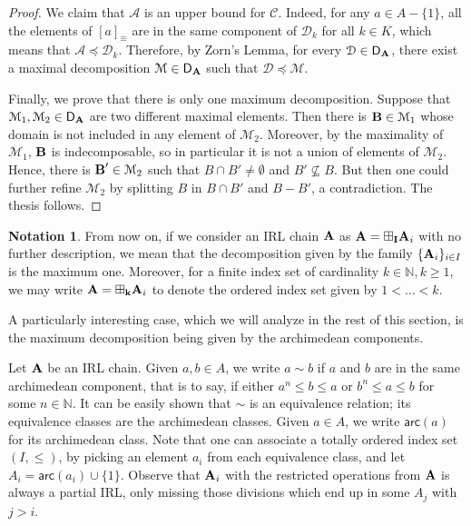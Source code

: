 \documentclass{amsart}
\theoremstyle{definition}
\newtheorem{notation}{Notation}
\numberwithin{equation}{section}
\newcommand{\alg}[1]{{\textbf{\upshape #1}}}  %
\newcommand{\vv}[1]{\mathsf {#1}}
\newcommand{\cc}[1]{\mathcal{#1}}
\newcommand{\arc}[1]{{\vv{arc}}(#1)}
\begin{document}
\begin{proof}
We claim that $\cc A$ is an upper bound for $\mathscr{C}$. Indeed, for any $a \in A-\{1\}$, all the elements of $[a]_\equiv$ are in the same component of $\cc D_k$ for all $k \in K$, which means that $\cc A \preceq \cc D_k$.
Therefore, by Zorn's Lemma, for every $\cc D \in \vv{D}_{\alg A}$, there exist a maximal decomposition $\cc M \in \vv{D}_{\alg A}$ such that $\cc D \preceq \cc M$. 

Finally, we prove that there is only one maximum decomposition.
Suppose that $\cc M_1, \cc M_2 \in \vv{D}_{\alg A}$ are two different maximal elements. Then there is $\alg B \in \cc M_1$ whose domain is not included in any element of $\cc M_2$. Moreover, by the maximality of $\cc M_1$, $\alg B$ is indecomposable, so in particular it is not a union of elements of $\cc M_2$. Hence, there is $\alg B' \in \cc M_2$ such that $B \cap B' \neq \emptyset$ and $B' \nsubseteq B$. But then one could further refine $\cc M_2$ by splitting $B$ in $B \cap B'$ and $B-B'$, a contradiction. The thesis follows.
\end{proof}
\begin{notation}\label{notation1}
	From now on, if we consider an IRL chain $\alg A$ as $\alg A = \boxplus_{\bf I} \alg A_i$ with no further description, we mean that the decomposition given by the family $\{\alg A_i\}_{i \in I}$ is the maximum one. Moreover, for a finite index set of cardinality $k \in \mathbb{N}, k \geq 1$, we may write $\alg A = \boxplus_{\bf k} \alg A_i$ to denote the ordered index set given by $1 < \ldots < k$.
\end{notation}
A particularly interesting case, which we will analyze in the rest of this section, is the maximum decomposition being given by the archimedean components.

Let $\alg A$ be an IRL chain. Given $a,b \in A$, we write $a \sim b$ if $a$ and $b$ are in the same archimedean component, that is to say, if either $a^n\leq b \leq a$ or $b^n \leq a \leq b$ for some $n \in \mathbb{N}$. It can be easily shown that $\sim$ is an equivalence relation; its equivalence classes are the archimedean classes. Given $a \in A$, we write $\arc a$ for its archimedean class. Note that one can associate a totally ordered index set $(I, \leq )$, by picking an element $a_i$ from each equivalence class, and let $A_i={\arc {a_i}} \cup \{1\}$. Observe that $\alg A_i$ with the restricted operations from $\alg A$ is always a partial IRL, only missing those divisions which end up in some $A_j$ with $j>i$.
\end{document}
